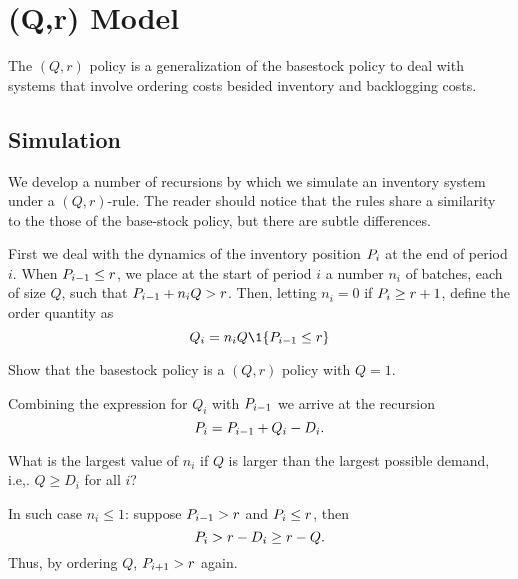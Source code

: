 \section{(Q,r) Model}
\label{sec:q-r-model}


The $(Q,r)$ policy is a generalization of the basestock policy to deal with systems that involve ordering costs besided inventory and backlogging costs. 

\subsection{Simulation}

We develop a number of recursions by which we  simulate an inventory system under a $(Q,r)$-rule. The reader should notice that the rules share a similarity to the those of the base-stock policy, but there are subtle differences. 

First we deal with the dynamics of the inventory position $P_i$ at the end of period $i$. When $P_{i-1}\leq r$, we place at the start of period $i$ a number $n_i$ of batches, each of size $Q$, such that $P_{i-1} + n_i Q > r$. Then, letting  $n_i=0$ if $P_i \geq r+1$, define the order quantity as 
\begin{equation}\label{eq:20}
Q_i = n_i Q \1{\IP_{i-1}\leq r}
\end{equation}

\begin{exercise}
  Show that the basestock policy is a $(Q,r)$ policy with $Q=1$. 
\end{exercise}


Combining the expression for $Q_i$ with $P_{i-1}$ we arrive at the recursion
\begin{equation}\label{eq:6}
  P_{i} = P_{i-1} + Q_{i} - D_i.
\end{equation}


\begin{exercise}
  What is the largest value of $n_i$ if $Q$ is larger than the largest possible demand, i.e,. $Q\geq D_i$ for all $i$?
  \begin{solution}
    In such case $n_i\leq 1$: suppose $P_{i-1} > r$ and $P_i \leq r$, then 
    \begin{equation*}
P_i > r-D_i \geq r - Q.
    \end{equation*}
Thus, by ordering $Q$, $P_{i+1} > r$ again.
  \end{solution}
\end{exercise}


